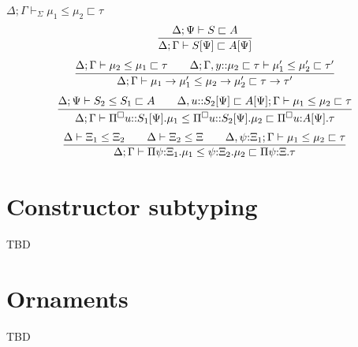 \documentclass[letterpaper, 11pt]{article}
\newcommand{\rar}{\rightarrow}
\begin{document}
    $\boxed{ \Delta; \Gamma \vdash_\Sigma \mu_1 \leq \mu_2 \sqsubset \tau}$
    \begin{align*}
      \infer{ \Delta; \Gamma \vdash S[\Psi] \sqsubset A[\Psi]}
            {
               \Delta; \Psi \vdash S \sqsubset A
            }
    \end{align*}
    \begin{align*}
      \infer{ \Delta; \Gamma \vdash\mu_1 \rar \mu_1' \leq \mu_2 \rar \mu_2' \sqsubset \tau \rar \tau'}
            {
               \Delta; \Gamma \vdash \mu_2 \leq \mu_1 \sqsubset \tau
              &&
               \Delta; \Gamma, y{::} \mu_2 \sqsubset \tau \vdash \mu_1' \leq \mu_2' \sqsubset \tau'
            }
    \end{align*}
    \begin{align*}
      \infer{ \Delta; \Gamma \vdash\Pi^\square u{::}S_1[\Psi]. \mu_1 \leq \Pi^\square u{::}S_2[\Psi]. \mu_2 \sqsubset \Pi^\square u{:} A[\Psi]. \tau}
            {
               \Delta; \Psi \vdash S_2 \leq S_1 \sqsubset A
              &&
               \Delta, u{::} S_2[\Psi] \sqsubset A[\Psi]; \Gamma \vdash \mu_1 \leq \mu_2 \sqsubset \tau
            }
    \end{align*}
    \begin{align*}
      \infer{ \Delta; \Gamma \vdash \Pi \psi{:}\Xi_1. \mu_1 \leq \psi{:}\Xi_2. \mu_2 \sqsubset \Pi \psi{:}\Xi. \tau}
            {
               \Delta \vdash \Xi_1 \leq \Xi_2
              &&
               \Delta \vdash \Xi_2 \leq \Xi
              &&
              \Delta,\psi{:}\Xi_1; \Gamma \vdash \mu_1 \leq \mu_2 \sqsubset \tau
            }
    \end{align*}

    \section{Constructor subtyping}
    TBD

    \section{Ornaments}
    TBD

    
        
\end{document}
